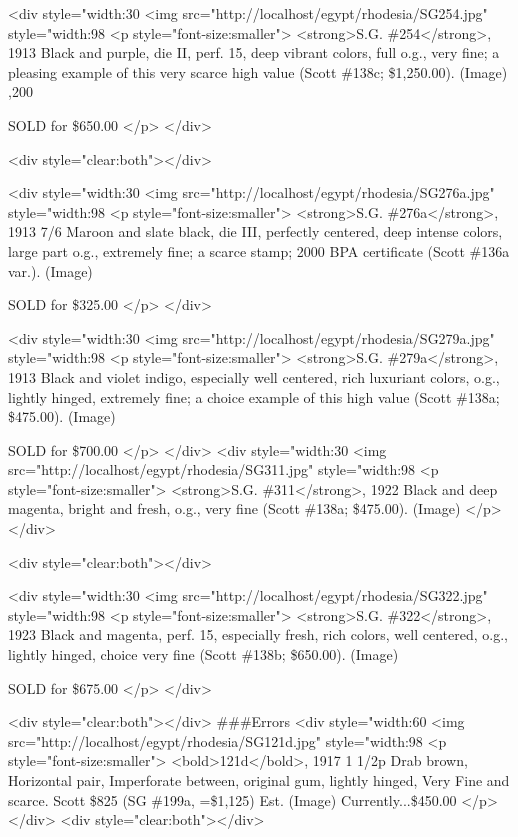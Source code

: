 <div style="width:30%
<img src="http://localhost/egypt/rhodesia/SG254.jpg" style="width:98%
<p style="font-size:smaller"> 
<strong>S.G. \#254</strong>, 1913  Black and purple, die II, perf. 15, deep vibrant colors, full o.g., very fine; a pleasing example of this very scarce high value (Scott \#138c; \$1,250.00). (Image) 	,200

SOLD for \$650.00
</p>
</div>

<div style="clear:both"></div>

<div style="width:30%
<img src="http://localhost/egypt/rhodesia/SG276a.jpg" style="width:98%
<p style="font-size:smaller"> 
<strong>S.G. \#276a</strong>, 1913 7/6 Maroon and slate black, die III, perfectly centered, deep intense colors, large part o.g., extremely fine; a scarce stamp; 2000 BPA certificate (Scott \#136a var.). (Image) 

SOLD for \$325.00 
</p>
</div>




<div style="width:30%
<img src="http://localhost/egypt/rhodesia/SG279a.jpg" style="width:98%
<p style="font-size:smaller"> 
<strong>S.G. \#279a</strong>, 1913  Black and violet indigo, especially well centered, rich luxuriant colors, o.g., lightly hinged, extremely fine; a choice example of this high value (Scott \#138a; \$475.00). (Image) 	

SOLD for \$700.00
</p>
</div>
<div style="width:30%
<img src="http://localhost/egypt/rhodesia/SG311.jpg" style="width:98%
<p style="font-size:smaller"> 
<strong>S.G. \#311</strong>, 1922  Black and deep magenta, bright and fresh, o.g., very fine (Scott \#138a; \$475.00). (Image)  
</p>
</div>

<div style="clear:both"></div>

<div style="width:30%
<img src="http://localhost/egypt/rhodesia/SG322.jpg" style="width:98%
<p style="font-size:smaller"> 
<strong>S.G. \#322</strong>, 1923  Black and magenta, perf. 15, especially fresh, rich colors, well centered, o.g., lightly hinged, choice very fine (Scott \#138b; \$650.00). (Image) 	

SOLD for \$675.00
</p>
</div>


<div style="clear:both"></div>
\#\#\#Errors
<div style="width:60%
<img src="http://localhost/egypt/rhodesia/SG121d.jpg" style="width:98%
<p style="font-size:smaller"> 
<bold>121d</bold>, 1917 1 1/2p Drab brown, Horizontal pair, Imperforate between, original gum, lightly hinged, Very Fine and scarce. Scott \$825 (SG \#199a, =\$1,125) Est.  (Image) 	Currently...\$450.00
</p>
</div>
<div style="clear:both"></div>










        
